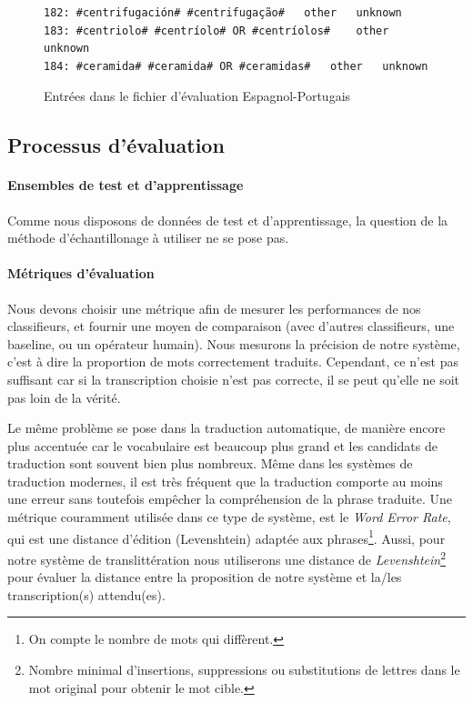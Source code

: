 \documentclass{article}
\begin{document}
\begin{figure}[H]
\caption{Entrées dans le fichier d'évaluation Espagnol-Portugais}
\begin{verbatim}
182: #centrifugación# #centrifugação#	other	unknown
183: #centriolo# #centríolo# OR #centríolos#	other	unknown
184: #ceramida# #ceramida# OR #ceramidas#	other	unknown
\end{verbatim}
\end{figure}

\subsection{Processus d'évaluation}
\paragraph{Ensembles de test et d'apprentissage}
Comme nous disposons de données de test et d'apprentissage, la question de la méthode d'échantillonage à utiliser ne se pose pas.

\paragraph{Métriques d'évaluation}
Nous devons choisir une métrique afin de mesurer les performances de nos classifieurs, et fournir une moyen de comparaison (avec d'autres classifieurs, une baseline, ou un opérateur humain).
Nous mesurons la précision de notre système, c'est à dire la proportion de mots correctement traduits. Cependant, ce n'est pas suffisant car si la transcription choisie n'est pas correcte, il se peut qu'elle ne soit pas loin de la vérité.

Le même problème se pose dans la traduction automatique, de manière encore plus accentuée car le vocabulaire est beaucoup plus grand et les candidats de traduction sont souvent bien plus nombreux. Même dans les systèmes de traduction modernes, il est très fréquent que la traduction comporte au moins une erreur sans toutefois empêcher la compréhension de la phrase traduite. Une métrique couramment utilisée dans ce type de système, est le \emph{Word Error Rate}, qui est une distance d'édition (Levenshtein) adaptée aux phrases\footnote{On compte le nombre de mots qui diffèrent.}.
Aussi, pour notre système de translittération nous utiliserons une distance de \emph{Levenshtein}\footnote{Nombre minimal d'insertions, suppressions ou substitutions de lettres dans le mot original pour obtenir le mot cible.} pour évaluer la distance entre la proposition de notre système et la/les transcription(s) attendu(es).
\end{document}
